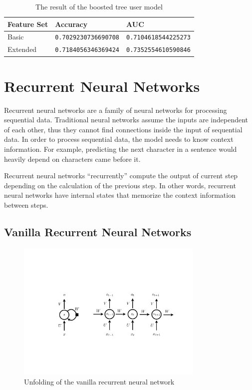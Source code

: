         \begin{table}[hpbt]
        \centering
        \begin{tabular}{lll}
            \hline
            Feature Set & Accuracy & AUC \\
            \hline
            Basic    & \verb|0.7029230736690708| & \verb|0.7104618544225273| \\
            Extended & \verb|0.7184056346369424| & \verb|0.7352554610590846| \\
            \hline
        \end{tabular}
        \caption{The result of the boosted tree user model}
        \label{table:xgboost result}
        \end{table}

\section{Recurrent Neural Networks}

    Recurrent neural networks are a family of neural networks for processing sequential data.
    Traditional neural networks assume the inputs are independent of each other,
    thus they cannot find connections inside the input of sequential data.
    In order to process sequential data, the model needs to know context information.
    For example, predicting the next character in a sentence would heavily depend on
    characters came before it.

    Recurrent neural networks ``recurrently'' compute the output of current step
    depending on the calculation of the previous step.
    In other words, recurrent neural networks have internal states
    that memorize the context information between steps.

    \subsection{Vanilla Recurrent Neural Networks}

        \begin{figure}[!htp]
            \centering
            \includegraphics[width=0.8\textwidth]{img/rnn.pdf}
            \caption{Unfolding of the vanilla recurrent neural network}
            \label{fig:rnn}
        \end{figure}

